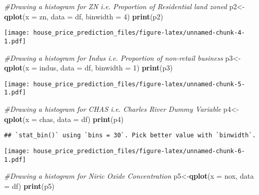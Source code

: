 \documentclass[
]{article}
\newenvironment{Shaded}{\begin{snugshade}}{\end{snugshade}}
\newcommand{\CommentTok}[1]{\textcolor[rgb]{0.56,0.35,0.01}{\textit{#1}}}
\newcommand{\DataTypeTok}[1]{\textcolor[rgb]{0.13,0.29,0.53}{#1}}
\newcommand{\DecValTok}[1]{\textcolor[rgb]{0.00,0.00,0.81}{#1}}
\newcommand{\KeywordTok}[1]{\textcolor[rgb]{0.13,0.29,0.53}{\textbf{#1}}}
\newcommand{\NormalTok}[1]{#1}
\begin{document}
\begin{Shaded}
\begin{Highlighting}[]
\CommentTok{#Drawing a histogram for ZN i.e. Proportion of Residential land zoned}
\NormalTok{p2<-}\KeywordTok{qplot}\NormalTok{(}\DataTypeTok{x =}\NormalTok{ zn, }\DataTypeTok{data =}\NormalTok{ df, }\DataTypeTok{binwidth =} \DecValTok{4}\NormalTok{)}
\KeywordTok{print}\NormalTok{(p2)}
\end{Highlighting}
\end{Shaded}

\texttt{[image: house\_price\_prediction\_files/figure-latex/unnamed-chunk-4-1.pdf]}

\begin{Shaded}
\begin{Highlighting}[]
\CommentTok{#Drawing a histogram for Indus i.e. Proportion of non-retail business}
\NormalTok{p3<-}\KeywordTok{qplot}\NormalTok{(}\DataTypeTok{x =}\NormalTok{ indus, }\DataTypeTok{data =}\NormalTok{ df, }\DataTypeTok{binwidth =} \DecValTok{1}\NormalTok{)}
\KeywordTok{print}\NormalTok{(p3)}
\end{Highlighting}
\end{Shaded}

\texttt{[image: house\_price\_prediction\_files/figure-latex/unnamed-chunk-5-1.pdf]}

\begin{Shaded}
\begin{Highlighting}[]
\CommentTok{#Drawing a histogram for CHAS i.e. Charles River Dummy Variable}
\NormalTok{p4<-}\KeywordTok{qplot}\NormalTok{(}\DataTypeTok{x =}\NormalTok{ chas, }\DataTypeTok{data =}\NormalTok{ df)}
\KeywordTok{print}\NormalTok{(p4)}
\end{Highlighting}
\end{Shaded}

\begin{verbatim}
## `stat_bin()` using `bins = 30`. Pick better value with `binwidth`.
\end{verbatim}

\texttt{[image: house\_price\_prediction\_files/figure-latex/unnamed-chunk-6-1.pdf]}

\begin{Shaded}
\begin{Highlighting}[]
\CommentTok{#Drawing a histogram for Niric Oxide Concentration}
\NormalTok{p5<-}\KeywordTok{qplot}\NormalTok{(}\DataTypeTok{x =}\NormalTok{ nox, }\DataTypeTok{data =}\NormalTok{ df)}
\KeywordTok{print}\NormalTok{(p5)}
\end{Highlighting}
\end{Shaded}
\end{document}
